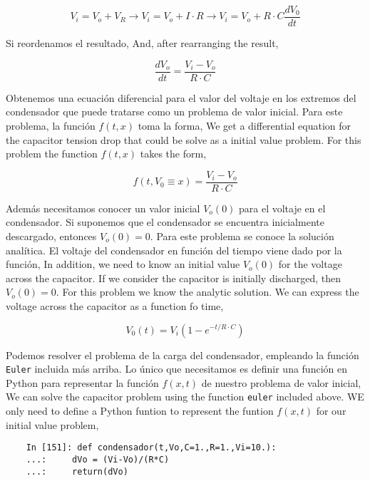 \begin{equation*}
V_i=V_o+V_R \rightarrow V_i=V_o+I\cdot R \rightarrow V_i=V_o+R\cdot C\frac{dV_0}{dt}
\end{equation*}
\begin{paracol}{2}
Si reordenamos el resultado,
\switchcolumn
And, after rearranging the result,  
\end{paracol}
\begin{equation*}
\frac{dV_o}{dt}=\frac{V_i-V_o}{R \cdot C}
\end{equation*}
\begin{paracol}{2}
Obtenemos una ecuación diferencial para el valor del voltaje en los extremos del condensador que puede tratarse como un  problema de valor inicial. Para este problema, la función $f(t,x)$ toma la forma,
\switchcolumn
We get a differential equation for the capacitor tension drop that could be solve as a initial value problem. For this problem the function $f(t,x)$ takes the form,
\end{paracol}
\begin{equation*}
f(t,V_0 \equiv x) = \frac{V_i-V_o}{R \cdot C}
\end{equation*}
\begin{paracol}{2}
Además necesitamos conocer un valor inicial $V_o(0)$ para el voltaje en el condensador. Si suponemos que el condensador se encuentra inicialmente descargado, entonces $V_o(0)=0$. Para este problema se conoce la solución analítica. El voltaje del condensador en función del tiempo viene dado por la función,
\switchcolumn
In addition, we need to know an initial value $V_o(0)$ for the voltage across the capacitor. If we consider the capacitor is initially discharged, then $V_o(0) = 0$. For this problem we know the analytic solution. We can express the voltage across the capacitor as a function fo time,
\end{paracol}
\begin{equation*}
V_0(t)=V_i\left(1-e^{-t/R\cdot C}\right)
\end{equation*} 

\begin{paracol}{2}
Podemos resolver el problema de la carga del condensador, empleando la función  \texttt{Euler} incluida más arriba. Lo único que necesitamos es definir una función en Python  para representar la función $f(x,t)$ de nuestro problema de valor inicial,
\switchcolumn
We can solve the capacitor problem using the function \texttt{euler} included above. WE only need to define a Python funtion to represent the funtion $f(x,t)$ for our initial value problem,
\end{paracol}
\begin{verbatim}
	In [151]: def condensador(t,Vo,C=1.,R=1.,Vi=10.):
	...:     dVo = (Vi-Vo)/(R*C)
	...:     return(dVo)
\end{verbatim}

